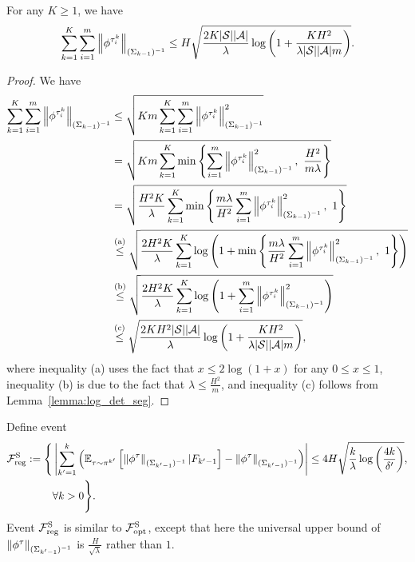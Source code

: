 \begin{lemma} \label{lemma:sum_phi_original_seg}
	For any $K\geq 1$, we have
	\begin{align*}
		\sum_{k=1}^{K} \sum_{i=1}^{m} \left\|  \phi^{\tau^k_i} \right\|_{(\Sigma_{k-1})^{-1}} \leq H \sqrt{ \frac{2K |\mathcal{S}| |\mathcal{A}|}{\lambda} \log \left(  1+ \frac{  KH^2 }{ \lambda |\mathcal{S}| |\mathcal{A}| m}  \right)} .
	\end{align*}
\end{lemma}
\begin{proof}		
	We have
	\begin{align*}
		\sum_{k=1}^{K} \sum_{i=1}^{m} \left\|  \phi^{\tau^k_i} \right\|_{(\Sigma_{k-1})^{-1}} &\leq \sqrt{ Km   \sum_{k=1}^{K} \sum_{i=1}^{m} \left\|  \phi^{\tau^k_i} \right\|_{(\Sigma_{k-1})^{-1}}^2 }
		\\
		&= \sqrt{ Km  \sum_{k=1}^{K} \min\left\{  \sum_{i=1}^{m} \left\|  \phi^{\tau^k_i} \right\|_{(\Sigma_{k-1})^{-1}}^2 ,\ \frac{H^2}{m \lambda}  \right\} }
		\\
		&= \sqrt{ \frac{H^2 K}{\lambda} \sum_{k=1}^{K} \min\left\{  \frac{m \lambda}{H^2} \sum_{i=1}^{m}   \left\|  \phi^{\tau^k_i} \right\|_{(\Sigma_{k-1})^{-1}}^2 ,\ 1  \right\} }
		\\
		&\overset{\textup{(a)}}{\leq}  \sqrt{ \frac{2H^2 K}{\lambda}  \sum_{k=1}^{K} \log\left(  1 +  \min\left\{  \frac{m \lambda}{H^2} \sum_{i=1}^{m}  \left\|  \phi^{\tau^k_i} \right\|_{(\Sigma_{k-1})^{-1}}^2 ,\ 1  \right\}  \right) }
		\\
		&\overset{\textup{(b)}}{\leq} \sqrt{ \frac{2H^2 K}{\lambda}  \sum_{k=1}^{K} \log \left(  1 + \sum_{i=1}^{m} \left\|  \phi^{\tau^k_i} \right\|_{(\Sigma_{k-1})^{-1}}^2  \right) }
		\\
		&\overset{\textup{(c)}}{\leq} \sqrt{ \frac{2KH^2 |\mathcal{S}| |\mathcal{A}|}{\lambda} \log \left(  1+ \frac{ KH^2 }{ \lambda |\mathcal{S}| |\mathcal{A}| m}  \right)} ,
	\end{align*}
	where inequality (a) uses the fact that $x \leq 2\log(1+x)$ for any $0 \leq x \leq 1$, inequality (b) is due to the fact that $\lambda \leq \frac{H^2}{m}$, and inequality (c) follows from Lemma~\ref{lemma:log_det_seg}.
\end{proof}

Define event 
\begin{align}
	\mathcal{F}^{\textup{S}}_{\textup{reg}}:=\Bigg\{& \left| \sum_{k'=1}^{k} \left(  \mathbb{E}_{\tau \sim \pi^{k'}}\left[  \left\|  \phi^{\tau} \right\|_{(\Sigma_{k'-1})^{-1}} | F_{k'-1} \right] - \left\|  \phi^{\tau} \right\|_{(\Sigma_{k'-1})^{-1}}  \right)  \right| \leq 4H\sqrt{ \frac{k}{\lambda} \log\left( \frac{4k}{\delta'} \right) } ,
	\nonumber\\ 
	&\forall k>0 \Bigg\} .
\end{align}
Event $\mathcal{F}^{\textup{S}}_{\textup{reg}}$ is similar to $\mathcal{F}^{\textup{S}}_{\textup{opt}}$, except that here the universal upper bound of $\left\|  \phi^{\tau} \right\|_{(\Sigma_{k'-1})^{-1}}$ is $\frac{H}{\sqrt{\lambda}}$ rather than $1$. 

